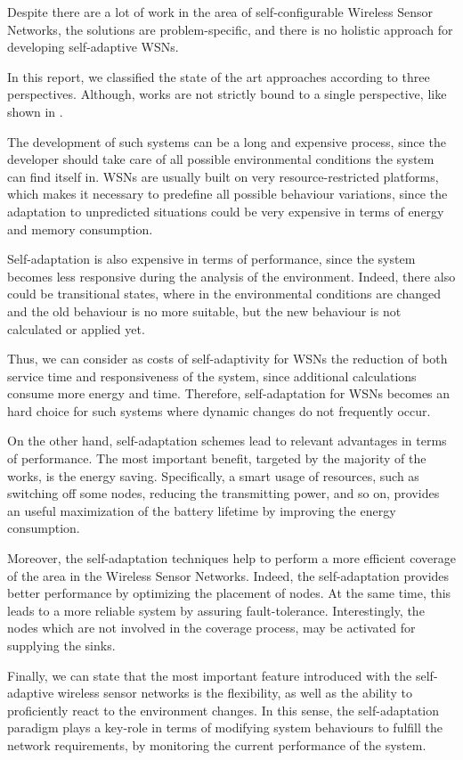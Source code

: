 
Despite there are a lot of work in the area of self-configurable Wireless Sensor
Networks, the solutions are problem-specific, and there is no holistic approach
for developing self-adaptive WSNs. 

In this report, we classified the state of the art approaches according to three
perspectives. Although, works are not strictly bound to a single perspective,
like shown in \cite{ascent}.

The development of such systems can be a long and expensive process, since the
developer should take care of all possible environmental conditions the system can
find itself in.  WSNs are usually built on very resource-restricted platforms,
which makes it necessary to predefine all possible behaviour variations, since
the adaptation to unpredicted situations could be very expensive in terms of
energy and memory consumption.

Self-adaptation is also expensive in terms of performance, since the system
becomes less responsive during the analysis of the environment. Indeed, there
also could be transitional states, where in the environmental conditions are
changed and the old behaviour is no more suitable, but the new behaviour is not
calculated or applied yet.

Thus, we can consider as
costs of self-adaptivity for WSNs the reduction of both service time and
responsiveness of the system, since additional calculations consume more energy
and time. Therefore, self-adaptation for WSNs becomes an hard choice for such
systems where dynamic changes do not frequently occur. 

On the other hand, self-adaptation schemes lead to relevant advantages in terms
of performance. The most important benefit, targeted by the majority of the
works, is the energy saving. Specifically, a smart usage of resources, such
as switching off some nodes, reducing the transmitting power, and so
on, provides an useful maximization of the battery lifetime by improving the
energy consumption. 

Moreover, the self-adaptation techniques help to perform a more efficient
coverage of the area in the Wireless Sensor Networks. Indeed, the
self-adaptation provides better performance by optimizing the placement of
nodes.  At the same time, this leads to a more reliable system by assuring
fault-tolerance. Interestingly, the nodes which are not involved in the coverage
process, may be activated for supplying the sinks.

Finally, we can state that the most important feature introduced with the
self-adaptive wireless sensor networks is the flexibility, as well as the
ability to proficiently react to the environment changes. In this sense, the
self-adaptation paradigm plays a key-role in terms of modifying system
behaviours to fulfill the network requirements, by monitoring the current
performance of the system.

